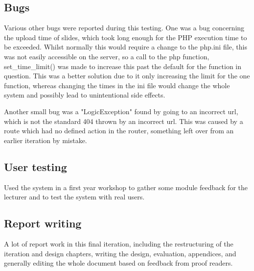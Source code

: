 \subsection{Bugs}
Various other bugs were reported during this testing. One was a bug concerning the upload time of slides, which took long enough for the PHP execution time to be exceeded. Whilst normally this would require a change to the php.ini file, this was not easily accessible on the server, so a call to the php function, set\_time\_limit() was made to increase this past the default for the function in question. This was a better solution due to it only increasing the limit for the one function, whereas changing the times in the ini file would change the whole system and possibly lead to unintentional side effects.

Another small bug was a "LogicException" found by going to an incorrect url, which is not the standard 404 thrown by an incorrect url. This was caused by a route which had no defined action in the router, something left over from an earlier iteration by mistake.

\subsection{User testing}
Used the system in a first year workshop to gather some module feedback for the lecturer and to test the system with real users.

\subsection{Report writing}
A lot of report work in this final iteration, including the restructuring of the iteration and design chapters, writing the design, evaluation, appendices, and generally editing the whole document based on feedback from proof readers.
\newpage